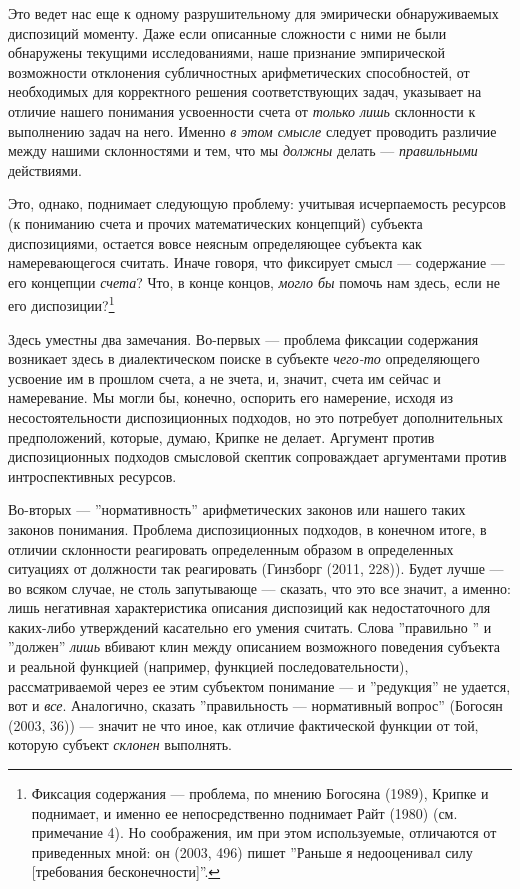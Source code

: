 \documentclass[11pt]{book}
\begin{document}
Это ведет нас еще к одному разрушительному для эмирически обнаруживаемых диспозиций моменту. Даже если описанные сложности с ними не были обнаружены текущими исследованиями, наше признание эмпирической возможности отклонения субличностных арифметических способностей, от необходимых для корректного решения соответствующих задач, указывает на отличие нашего понимания усвоенности счета от \textit{только лишь} склонности к выполнению задач на него. Именно \textit{в этом смысле} следует проводить различие между нашими склонностями и тем, что мы \textit{должны} делать --- \textit{правильными} действиями.

Это, однако, поднимает следующую проблему: учитывая исчерпаемость ресурсов (к пониманию счета и прочих математических концепций) субъекта диспозициями, остается вовсе неясным определяющее субъекта как намеревающегося считать. Иначе говоря, что фиксирует смысл --- содержание --- его концепции \textit{счета}? Что, в конце концов, \textit{могло бы} помочь нам здесь, если не его диспозиции?\footnote{Фиксация содержания --- проблема, по мнению Богосяна (1989), Крипке и поднимает, и именно ее непосредственно поднимает Райт (1980) (см. примечание 4). Но соображения, им при этом используемые, отличаются от приведенных мной: он (2003, 496) пишет ''Раньше я недооценивал силу [требования бесконечности]''.}

Здесь уместны два замечания. Во-первых --- проблема фиксации содержания возникает здесь в диалектическом поиске в субъекте \textit{чего-то} определяющего усвоение им в прошлом счета, а не зчета, и, значит, счета им сейчас и намеревание. Мы могли бы, конечно, оспорить его намерение, исходя из несостоятельности диспозиционных подходов, но это потребует дополнительных предположений, которые, думаю, Крипке не делает. Аргумент против диспозиционных подходов смысловой скептик сопроваждает аргументами против интроспективных ресурсов.

Во-вторых --- ''нормативность'' арифметических законов или нашего таких законов понимания. Проблема диспозиционных подходов, в конечном итоге, в отличии склонности реагировать определенным образом в определенных ситуациях от должности так реагировать (Гинзборг (2011, 228)). Будет лучше --- во всяком случае, не столь запутывающе --- сказать, что это все значит, а именно: лишь негативная характеристика описания диспозиций как недостаточного для каких-либо утверждений касательно его умения считать. Слова ''правильно '' и ''должен'' \textit{лишь} вбивают клин между описанием возможного поведения субъекта и реальной функцией (например, функцией последовательности), рассматриваемой через ее этим субъектом понимание --- и ''редукция'' не удается, вот и \textit{все}. Аналогично, сказать ''правильность --- нормативный вопрос'' (Богосян (2003, 36)) --- значит не что иное, как отличие фактической функции от той, которую субъект \textit{склонен} выполнять.
\end{document}
